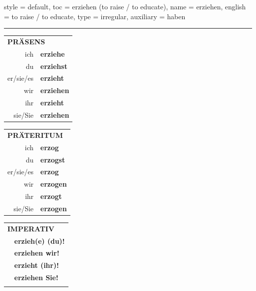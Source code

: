 \begin{verbentry}{
  style = {default},
  toc = {erziehen (to raise / to educate)},
  name = {erziehen},
  english = {to raise / to educate},
  type = {irregular},
  auxiliary = {haben}
}
 
    
     \vspace{5pt}

    \hrule
    
    \vspace{5pt}

  \begin{tabular}{rl}
     \multicolumn{2}{l}{\textbf{PRÄSENS} }\\
    ich & \textbf{erziehe}\\
    du & \textbf{erziehst}\\
    er/sie/es & \textbf{erzieht}\\
    wir & \textbf{erziehen}\\
    ihr & \textbf{erzieht}\\
    sie/Sie & \textbf{erziehen}\\
  \end{tabular}
  \hfill
     \begin{tabular}{rl}
    \multicolumn{2}{l}{\textbf{PRÄTERITUM} }\\
    ich & \textbf{erzog}\\
    du & \textbf{erzogst}\\
    er/sie/es & \textbf{erzog}\\
    wir & \textbf{erzogen}\\
    ihr & \textbf{erzogt}\\
    sie/Sie & \textbf{erzogen}\\
  \end{tabular}
  \hfill
  \begin{tabular}{rl}
     \multicolumn{2}{l}{\textbf{IMPERATIV} }\\
   & \textbf{erzieh(e) (du)!}\\
   & \textbf{erziehen wir!}\\
   & \textbf{erzieht (ihr)!}\\
   & \textbf{erziehen Sie!}\\
   & \vspace{10pt}
  \end{tabular}

    \vspace{10pt}


\end{verbentry}
